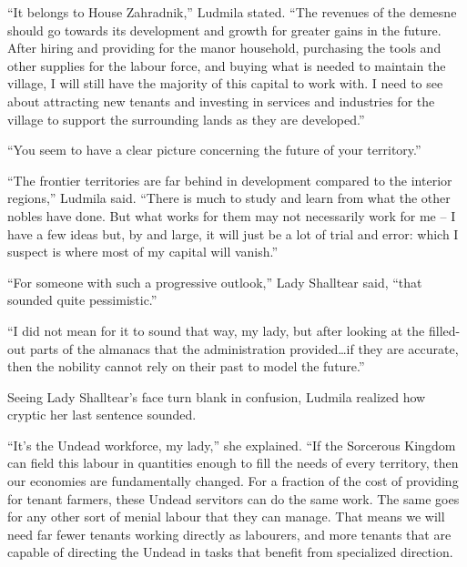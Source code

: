  

“It belongs to House Zahradnik,” Ludmila stated. “The revenues of the demesne should go towards its development and growth for greater gains in the future. After hiring and providing for the manor household, purchasing the tools and other supplies for the labour force, and buying what is needed to maintain the village, I will still have the majority of this capital to work with. I need to see about attracting new tenants and investing in services and industries for the village to support the surrounding lands as they are developed.”

 

“You seem to have a clear picture concerning the future of your territory.”

 

“The frontier territories are far behind in development compared to the interior regions,” Ludmila said. “There is much to study and learn from what the other nobles have done. But what works for them may not necessarily work for me – I have a few ideas but, by and large, it will just be a lot of trial and error: which I suspect is where most of my capital will vanish.”

 

“For someone with such a progressive outlook,” Lady Shalltear said, “that sounded quite pessimistic.”

 

“I did not mean for it to sound that way, my lady, but after looking at the filled-out parts of the almanacs that the administration provided…if they are accurate, then the nobility cannot rely on their past to model the future.”

 

Seeing Lady Shalltear’s face turn blank in confusion, Ludmila realized how cryptic her last sentence sounded.

 

“It’s the Undead workforce, my lady,” she explained. “If the Sorcerous Kingdom can field this labour in quantities enough to fill the needs of every territory, then our economies are fundamentally changed. For a fraction of the cost of providing for tenant farmers, these Undead servitors can do the same work. The same goes for any other sort of menial labour that they can manage. That means we will need far fewer tenants working directly as labourers, and more tenants that are capable of directing the Undead in tasks that benefit from specialized direction.

 

